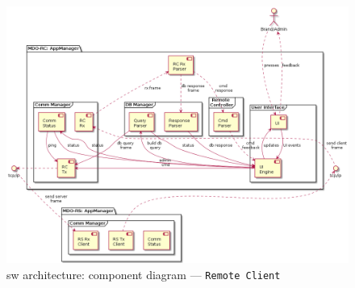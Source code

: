 \begin{figure}[htb!]
\centering
    \includegraphics[width=0.9\columnwidth]{./img/component-diag-rc.png}
  \caption{\gls{sw} architecture: component diagram --- \texttt{Remote Client}}%
\label{fig:component-diag-rc}
\end{figure}

